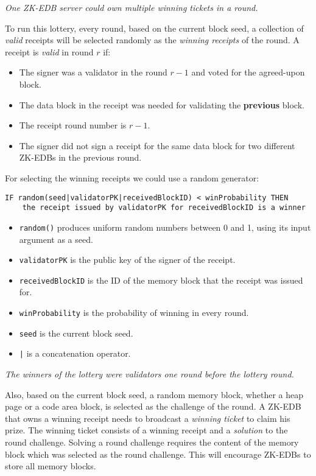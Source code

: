 \documentclass[a4paper]{report}
\newcommand{\note}[1] {
    \begin{tcolorbox}[colframe=white,colback=white]
        \emph{#1}
    \end{tcolorbox}
}
\begin{document}
    \note{One ZK-EDB server could own multiple winning tickets in a round.}

    To run this lottery, every round, based on the current block seed, a collection of \emph{valid} receipts will be
    selected randomly as the \emph{winning receipts} of the round. A receipt is \emph{valid} in round \(r\) if:

    \begin{itemize}
        \item The signer was a validator in the round \(r - 1\) and voted for the agreed-upon block.
        \item The data block in the receipt was needed for validating the \textbf{previous} block.
        \item The receipt round number is \(r - 1\).
        \item The signer did not sign a receipt for the same data block for two different ZK-EDBs in the previous round.
    \end{itemize}
    For selecting the winning receipts we could use a random generator:
    \begin{verbatim}
IF random(seed|validatorPK|receivedBlockID) < winProbability THEN
    the receipt issued by validatorPK for receivedBlockID is a winner
    \end{verbatim}
    \begin{itemize}
        \item \texttt{random()} produces uniform random numbers between 0 and 1, using its input argument as a seed.
        \item \texttt{validatorPK} is the public key of the signer of the receipt.
        \item \texttt{receivedBlockID} is the ID of the memory block that the receipt was issued for.
        \item \texttt{winProbability} is the probability of winning in every round.
        \item \texttt{seed} is the current block seed.
        \item \texttt{|} is a concatenation operator.
    \end{itemize}

    \note{The winners of the lottery were validators one round before the lottery round.}

    Also, based on the current block seed, a random memory block, whether a heap page or a code area block, is
    selected as the challenge of the round. A ZK-EDB that owns a winning receipt needs to broadcast a \emph{winning
    ticket} to claim his prize. The winning ticket consists of a winning receipt and a \emph{solution} to the round
    challenge. Solving a round challenge requires the content of the memory block which was selected as the round
    challenge. This will encourage ZK-EDBs to store all memory blocks.
\end{document}
